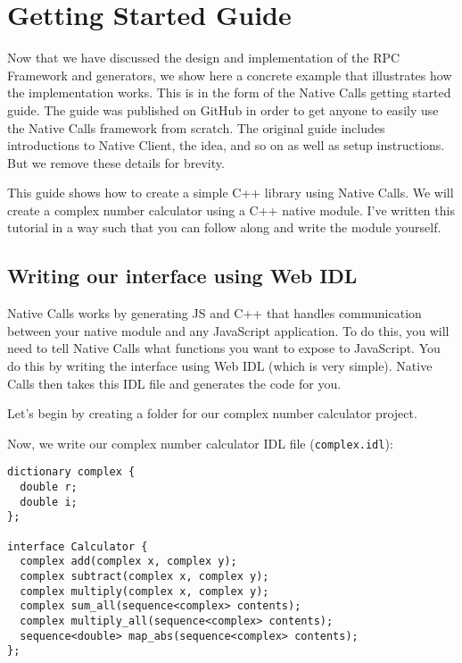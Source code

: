 \section{Getting Started Guide} %
\label{sec:end_to_end_example}
Now that we have discussed the design and implementation of the RPC Framework and generators, we show here a concrete example that illustrates how the implementation works. This is in the form of the Native Calls getting started guide. The guide was published on GitHub in order to get anyone to easily use the Native Calls framework from scratch. The original guide includes introductions to Native Client, the idea, and so on as well as setup instructions. But we remove these details for brevity.

This guide shows how to create a simple C++ library using Native Calls.
We will create a complex number calculator using a C++ native module.
I've written this tutorial in a way such that you can follow along and
write the module yourself.

\subsection{Writing our interface using Web
IDL}\label{writing-our-interface-using-web-idl}

Native Calls works by generating JS and C++ that handles communication
between your native module and any JavaScript application. To do this,
you will need to tell Native Calls what functions you want to expose to
JavaScript. You do this by writing the interface using Web IDL (which is
very simple). Native Calls then takes this IDL file and generates the
code for you.

Let's begin by creating a folder for our complex number calculator
project.

\begin{Shaded}
\begin{Highlighting}[]
 
 
 
\end{Highlighting}
\end{Shaded}

Now, we write our complex number calculator IDL file
(\texttt{complex.idl}):

\begin{verbatim}
dictionary complex {
  double r;
  double i;
};

interface Calculator {
  complex add(complex x, complex y);
  complex subtract(complex x, complex y);
  complex multiply(complex x, complex y);
  complex sum_all(sequence<complex> contents);
  complex multiply_all(sequence<complex> contents);
  sequence<double> map_abs(sequence<complex> contents);
};
\end{verbatim}

